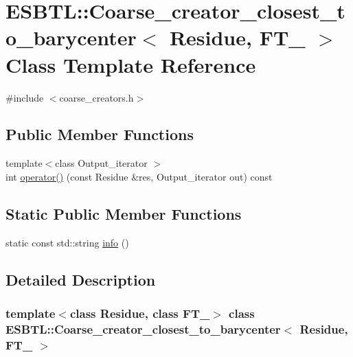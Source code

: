 \hypertarget{classESBTL_1_1Coarse__creator__closest__to__barycenter}{}\section{E\+S\+B\+TL\+:\+:Coarse\+\_\+creator\+\_\+closest\+\_\+to\+\_\+barycenter$<$ Residue, F\+T\+\_\+ $>$ Class Template Reference}
\label{classESBTL_1_1Coarse__creator__closest__to__barycenter}


{\ttfamily \#include $<$coarse\+\_\+creators.\+h$>$}

\subsection*{Public Member Functions}
\begin{DoxyCompactItemize}
\item 
{\footnotesize template$<$class Output\+\_\+iterator $>$ }\\int \hyperlink{classESBTL_1_1Coarse__creator__closest__to__barycenter_aa6921d3c94810e7564188b837cf40191}{operator()} (const Residue \&res, Output\+\_\+iterator out) const
\end{DoxyCompactItemize}
\subsection*{Static Public Member Functions}
\begin{DoxyCompactItemize}
\item 
static const std\+::string \hyperlink{classESBTL_1_1Coarse__creator__closest__to__barycenter_a22f90422bb755d78f11b3f34094de0b2}{info} ()
\end{DoxyCompactItemize}


\subsection{Detailed Description}
\subsubsection*{template$<$class Residue, class F\+T\+\_\+$>$\newline
class E\+S\+B\+T\+L\+::\+Coarse\+\_\+creator\+\_\+closest\+\_\+to\+\_\+barycenter$<$ Residue, F\+T\+\_\+ $>$}

